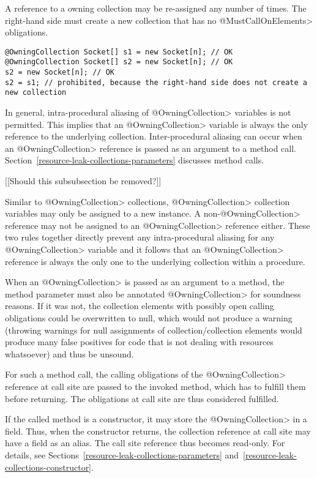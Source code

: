 A reference to a owning collection may be re-assigned any number of times.
The right-hand side must create a new collection that has no
\<@MustCallOnElements> obligations.

\begin{verbatim}
@OwningCollection Socket[] s1 = new Socket[n]; // OK
@OwningCollection Socket[] s2 = new Socket[n]; // OK
s2 = new Socket[n]; // OK
s2 = s1; // prohibited, because the right-hand side does not create a new collection
\end{verbatim}

In general, intra-procedural aliasing of \<@OwningCollection> variables is not
permitted.  This implies that an \<@OwningCollection> variable is always the
only reference to the underlying collection.  Inter-procedural aliasing can
occur when an \<@OwningCollection> reference is passed as an argument to a
method call.  Section~\ref{resource-leak-collections-parameters} discusses
method calls.



[[Should this subsubsection be removed?]]

Similar to \<@OwningCollection> collections, \<@OwningCollection> collection variables may only be assigned to a new instance. A non-\<@OwningCollection> reference may not be assigned to an \<@OwningCollection> reference either. These two rules together directly prevent any intra-procedural aliasing for any \<@OwningCollection> variable and it follows that an \<@OwningCollection> reference is always the only one to the underlying collection within a procedure.

When an \<@OwningCollection> is passed as an argument to a method, the method parameter must also be annotated \<@OwningCollection> for soundness reasons. If it was not, the collection elements with possibly open calling obligations could be overwritten to null, which would not produce a warning (throwing warnings for null assignments of collection/collection elements would produce many false positives for code that is not dealing with resources whatsoever) and thus be unsound.

For such a method call, the calling obligations of the \<@OwningCollection>
reference at call site are passed to the invoked method, which has to
fulfill them before returning. The obligations at call site are thus
considered fulfilled.

If the called method is a constructor, it may store the \<@OwningCollection> in
a field. Thus, when the constructor returns, the collection reference at call
site may have a field as an alias. The call site reference thus becomes
read-only. For details, see Sections~\ref{resource-leak-collections-parameters}
and~\ref{resource-leak-collections-constructor}.


